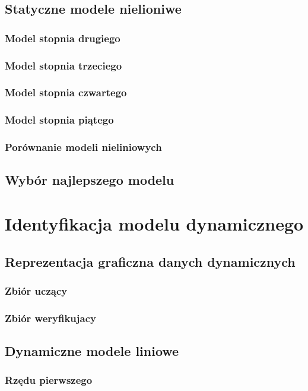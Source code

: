 \documentclass[a4paper, 11pt]{article}
\begin{document}
\subsection{Statyczne modele nielioniwe}
\subsubsection{Model stopnia drugiego}
\subsubsection{Model stopnia trzeciego}
\subsubsection{Model stopnia czwartego}
\subsubsection{Model stopnia piątego}
\subsubsection{Porównanie modeli nieliniowych}
\subsection{Wybór najlepszego modelu}


\section{Identyfikacja modelu dynamicznego}
\subsection{Reprezentacja graficzna danych dynamicznych}
\subsubsection{Zbiór uczący}
\subsubsection{Zbiór weryfikujacy}
\subsection{Dynamiczne modele liniowe}
\subsubsection{Rzędu pierwszego}
\end{document}
